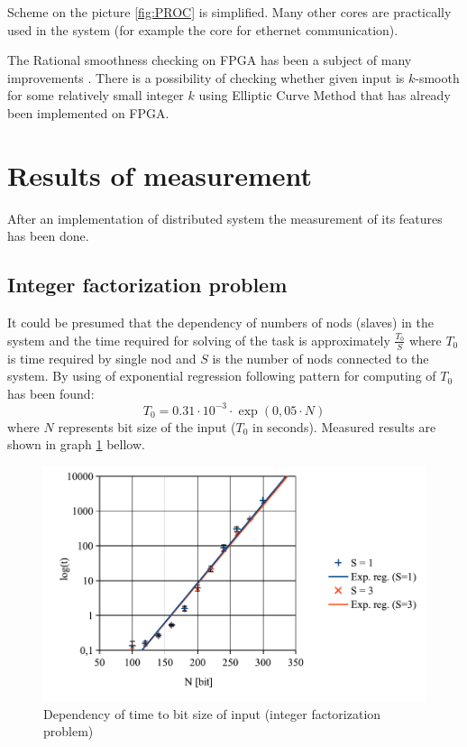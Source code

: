 \documentclass[conference]{IEEEtran}
\begin{document}
Scheme on the picture \eqref{fig:PROC} is simplified. Many other cores are practically used in the system (for example the core for ethernet communication). 

The Rational smoothness checking on FPGA has been a subject of many improvements \cite{meulenaer}. There is a possibility of checking whether given input is $k$-smooth for some relatively small integer $k$ using Elliptic Curve Method that has already been implemented on FPGA.
%



\section{Results of measurement}
After an implementation of distributed system the measurement of its features has been done.%

\subsection{Integer factorization problem}
It could be presumed that the dependency of numbers of nods (slaves) in the system and the time required for solving of the task is approximately $\frac{T_0}{S}$ where $T_0$ is time required by single nod and $S$ is the number of nods connected to the system. By using of exponential regression following pattern for computing of $T_0$ has been found:
\begin{equation}
T_0 = 0.31 \cdot 10^{-3} \cdot \exp \left( 0,05 \cdot N \right)
\end{equation}
where $N$ represents bit size of the input ($T_0$ in seconds). Measured results are shown in graph \ref{fig:RSA} bellow.


\begin{figure}[htbp]
\centerline{\includegraphics[scale=0.5]{RSA1.pdf} \vspace{-10pt}}
\caption{\label{fig:RSA}Dependency of time to bit size of input (integer factorization problem)}
\end{figure}
\end{document}

